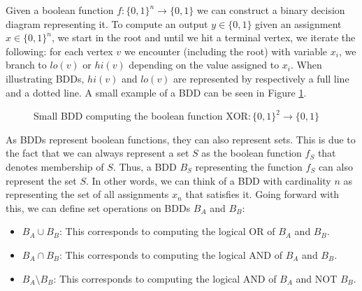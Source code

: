 \documentclass[../master/master.tex]{subfiles}
\begin{document}
Given a boolean function $f: \{0,1\}^n \rightarrow \{0,1\}$ we can construct a binary decision diagram representing it. To compute an output $y\in \{0,1\}$ given an assignment  $x\in\{0,1\}^n$, we start in the root and until we hit a terminal vertex, we iterate the following: for each vertex $v$ we encounter (including the root) with variable $x_i$, we branch to $lo(v)$ or $hi(v)$ depending on the value assigned to $x_i$. When illustrating BDDs, $hi(v)$ and $lo(v)$ are represented by respectively a full line and a dotted line. A small example of a BDD can be seen in Figure \ref{simplebdd}.

\begin{figure}[H]
\center
{}
\caption{Small BDD computing the boolean function $\text{XOR}:\{0,1\}^2 \rightarrow \{0,1\}$}
\label{simplebdd}
\end{figure}

As BDDs represent boolean functions, they can also represent sets. This is due to the fact that we can always represent a set $S$ as the boolean function $f_S$ that denotes membership of $S$. Thus, a BDD $B_S$ representing the function $f_S$ can also represent the set $S$. In other words, we can think of a BDD with cardinality $n$ as representing the set of all assignments $x_n$ that satisfies it. Going forward with this, we can define set operations on BDDs $B_A$ and $B_B$:
\begin{itemize}
\item $B_A\cup B_B$: This corresponds to computing the logical OR of $B_A$ and $B_B$.
\item $B_A\cap B_B$: This corresponds to computing the logical AND of $B_A$ and $B_B$.
\item $B_A\setminus B_B$: This corresponds to computing the logical AND of $B_A$ and NOT $B_B$.
\end{itemize}
\end{document}
